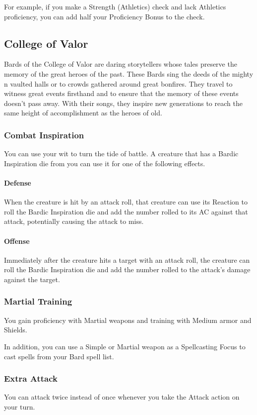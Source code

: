 \documentclass[letterpaper,openany,oneside,twocolumn]{book}
\begin{document}
For example, if you make a Strength (Athletics) check and lack Athletics proficiency, you can add half your Proficiency Bonus to the check.

\subsection*{College of Valor}
Bards of the College of Valor are daring storytellers whose tales preserve the memory of the great heroes of the past. These Bards sing the deeds of the mighty n vaulted halls or to crowds gathered around great bonfires. They travel to witness great events firsthand and to ensure that the memory of these events doesn't pass away. With their songs, they inspire new generations to reach the same height of accomplishment as the heroes of old.
\subsubsection*{Combat Inspiration}
You can use your wit to turn the tide of battle. A creature that has a Bardic Inspiration die from you can use it for one of the following effects.
\paragraph*{Defense} When the creature is hit by an attack roll, that creature can use its Reaction to roll the Bardic Inspiration die and add the number rolled to its AC against that attack, potentially causing the attack to miss.
\paragraph*{Offense} Immediately after the creature hits a target with an attack roll, the creature can roll the Bardic Inspiration die and add the number rolled to the attack's damage against the target.
\subsubsection*{Martial Training}
You gain proficiency with Martial weapons and training with Medium armor and Shields.

In addition, you can use a Simple or Martial weapon as a Spellcasting Focus to cast spells from your Bard spell list.
\subsubsection*{Extra Attack}
You can attack twice instead of once whenever you take the Attack action on your turn.
\end{document}
